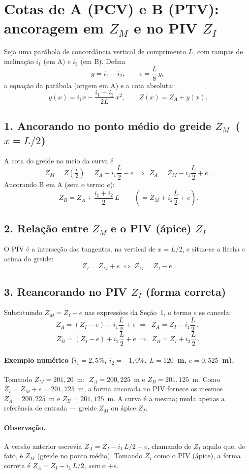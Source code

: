 
\section*{Cotas de A (PCV) e B (PTV): ancoragem em $Z_M$ e no PIV $Z_I$}

Seja uma parábola de concordância vertical de comprimento $L$, com rampas de
inclinação $i_1$ (em A) e $i_2$ (em B). Defina
\[
g = i_1 - i_2, \qquad e = \frac{L}{8}\,g,
\]
a equação da parábola (origem em A) e a cota absoluta:
\[
y(x) = i_1 x - \frac{i_1 - i_2}{2L}\,x^2, \qquad Z(x) = Z_A + y(x).
\]

\subsection*{1. Ancorando no ponto médio do greide $Z_M$ \,($x = L/2$)}

A cota do greide no meio da curva é
\[
Z_M = Z\!\left(\tfrac{L}{2}\right) = Z_A + i_1\frac{L}{2} - e
\;\Longrightarrow\;
\boxed{\,Z_A = Z_M - i_1\frac{L}{2} + e\,}.
\]
Ancorando B em A (sem o termo $e$):
\[
\boxed{\,Z_B = Z_A + \frac{i_1+i_2}{2}\,L\,}
\qquad\left(= Z_M + i_2\frac{L}{2} + e\right).
\]

\subsection*{2. Relação entre $Z_M$ e o PIV (ápice) $Z_I$}

O PIV é a interseção das tangentes, na vertical de $x=L/2$, e situa-se a flecha
$e$ acima do greide:
\[
\boxed{\,Z_I = Z_M + e \;\Longleftrightarrow\; Z_M = Z_I - e\,}.
\]

\subsection*{3. Reancorando no PIV $Z_I$ (forma correta)}

Substituindo $Z_M = Z_I - e$ nas expressões da Seção~1, o termo $e$ se cancela:
\[
Z_A = (Z_I - e) - i_1\frac{L}{2} + e
\;\Longrightarrow\;
\boxed{\,Z_A = Z_I - i_1\frac{L}{2}\,},
\]
\[
Z_B = (Z_I - e) + i_2\frac{L}{2} + e
\;\Longrightarrow\;
\boxed{\,Z_B = Z_I + i_2\frac{L}{2}\,}.
\]

\paragraph{Exemplo numérico ($i_1=2{,}5\%$, $i_2=-1{,}0\%$, $L=120$~m, $e=0{,}525$~m).}
Tomando $Z_M = 201{,}20$~m: $\;Z_A = 200{,}225$~m e $Z_B = 201{,}125$~m.
Como $Z_I = Z_M + e = 201{,}725$~m, a forma ancorada no PIV fornece os mesmos
$Z_A = 200{,}225$~m e $Z_B = 201{,}125$~m. A curva é a mesma; muda apenas a
referência de entrada — greide $Z_M$ ou ápice $Z_I$.

\paragraph{Observação.}
A versão anterior escrevia $Z_A = Z_I - i_1\,L/2 + e$, chamando de $Z_I$ aquilo
que, de fato, é $Z_M$ (greide no ponto médio). Tomando $Z_I$ como o PIV (ápice),
a forma correta é $Z_A = Z_I - i_1\,L/2$, \emph{sem} o $+e$.
